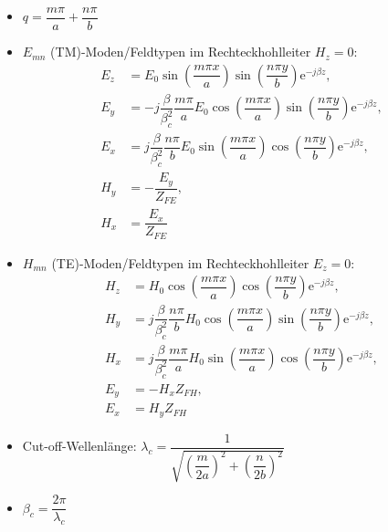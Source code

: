 \begin{itemize}
    \itemsep0pt
    \item \(q = \dfrac{m\pi}{a} + \dfrac{n\pi}{b}\)
    \item \(E_{mn}\) (TM)-Moden/Feldtypen im Rechteckhohlleiter \(H_z = 0\):
        \begin{align*}
            E_z &= E_0 \sin\left(\dfrac{m\pi x}{a}\right)\sin\left(\dfrac{n\pi y}{b}\right)\mathrm{e}^{-j\beta z},\\
            E_y &= -j\dfrac{\beta}{\beta_c^2} \dfrac{m\pi}{a}  E_0\cos\left(\dfrac{m\pi x}{a}\right)\sin\left(\dfrac{n\pi y}{b}\right)\mathrm{e}^{-j\beta z},\\
            E_x &= j\dfrac{\beta}{\beta_c^2} \dfrac{n\pi}{b} E_0 \sin\left(\dfrac{m\pi x}{a}\right)\cos\left(\dfrac{n\pi y}{b}\right)\mathrm{e}^{-j\beta z},\\
            H_y &= -\dfrac{E_y}{Z_{FE}},\\
            H_x &= \dfrac{E_x}{Z_{FE}}
        \end{align*}
    \item \(H_{mn}\) (TE)-Moden/Feldtypen im Rechteckhohlleiter \(E_z = 0\):
        \begin{align*}
            H_z &= H_0 \cos\left(\dfrac{m\pi x}{a}\right)\cos\left(\dfrac{n\pi y}{b}\right)\mathrm{e}^{-j\beta z},\\
            H_y &= j\dfrac{\beta}{\beta_c^2} \dfrac{n\pi}{b}  H_0 \cos\left(\dfrac{m\pi x}{a}\right)\sin\left(\dfrac{n\pi y}{b}\right)\mathrm{e}^{-j\beta z},\\
            H_x &= j\dfrac{\beta}{\beta_c^2} \dfrac{m\pi}{a} H_0 \sin\left(\dfrac{m\pi x}{a}\right)\cos\left(\dfrac{n\pi y}{b}\right)\mathrm{e}^{-j\beta z},\\
            E_y &= -H_x Z_{FH},\\
            E_x &= H_y Z_{FH}
        \end{align*}
    \item Cut-off-Wellenlänge: \(\lambda_c = \dfrac{1}{\sqrt{ \left(\dfrac{m}{2a}\right)^2 + \left(\dfrac{n}{2b}\right)^2 }}\)
    \item \(\beta_c = \dfrac{2\pi}{\lambda_c}\)
\end{itemize}
